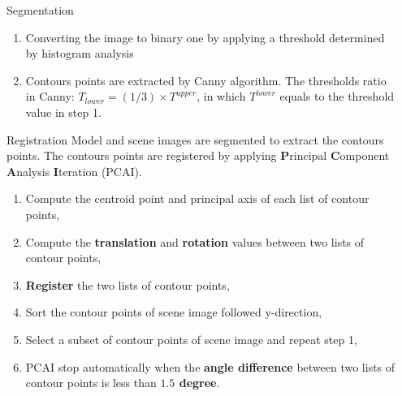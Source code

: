\documentclass{LaBRI_poster}
\begin{document}
\begin{frame}[t]
\begin{columns}[t]
\end{columns}


\begin{columns}[t]

\begin{column}{\sepwidth}\end{column} %


\begin{column}{\twocolwidth}

\begin{block}{Segmentation}
	\begin{enumerate}
		\item Converting the image to binary one by applying a threshold determined by histogram analysis
		\item Contours points are extracted by Canny algorithm. The thresholds ratio in Canny: $T_{lower} = (1/3) \times T^{upper}$, in which $T^{lower}$ equals to the threshold value in step 1.
	\end{enumerate}
\end{block}



\vspace{5pt}

\begin{block}{Registration}
Model and scene images are segmented to extract the contours points. The contours points are registered by applying \textbf{P}rincipal \textbf{C}omponent \textbf{A}nalysis\cite{} \textbf{I}teration (PCAI).
 \begin{enumerate}
    		\item Compute the centroid point and principal axis of each list of contour points,
    		\item Compute the \textbf{translation} and \textbf{rotation} values between two lists of contour points,
    		\item \textbf{Register} the two lists of contour points,
    		\item Sort the contour points of scene image followed y-direction,
    		\item Select a subset of contour points of scene image and repeat step 1,
    		\item PCAI stop automatically when the \textbf{angle difference} between two 
    	lists of contour points is less than \textbf{$1.5$ degree}.
    \end{enumerate}
\end{block}


\end{column}
\end{columns}
\end{frame}
\end{document}
